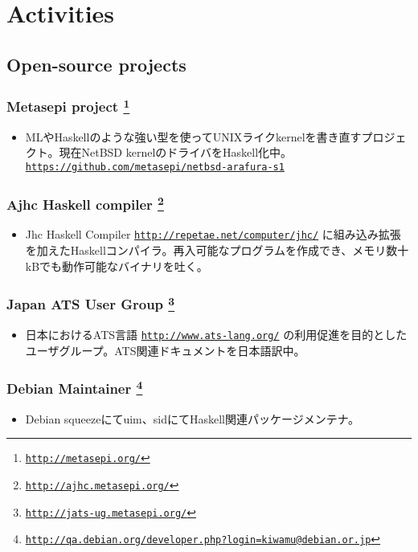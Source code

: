 \documentclass[letterpaper]{article}
\begin{document}
\section*{Activities}

\subsection*{Open-source projects}

\subsubsection*{Metasepi project \footnote{\href{http://metasepi.org/}{\tt http://metasepi.org/}}}
\begin{itemize}
\item MLやHaskellのような強い型を使ってUNIXライクkernelを書き直すプロジェクト。現在NetBSD kernelのドライバをHaskell化中。 \href{https://github.com/metasepi/netbsd-arafura-s1}{\tt https://github.com/metasepi/netbsd-arafura-s1}
\end{itemize}

\subsubsection*{Ajhc Haskell compiler \footnote{\href{http://ajhc.metasepi.org/}{\tt http://ajhc.metasepi.org/}}}
\begin{itemize}
\item Jhc Haskell Compiler \href{http://repetae.net/computer/jhc/}{\tt http://repetae.net/computer/jhc/} に組み込み拡張を加えたHaskellコンパイラ。再入可能なプログラムを作成でき、メモリ数十kBでも動作可能なバイナリを吐く。
\end{itemize}

\subsubsection*{Japan ATS User Group \footnote{\href{http://jats-ug.metasepi.org/}{\tt http://jats-ug.metasepi.org/}}}
\begin{itemize}
\item 日本におけるATS言語 \href{http://www.ats-lang.org/}{\tt http://www.ats-lang.org/} の利用促進を目的としたユーザグループ。ATS関連ドキュメントを日本語訳中。
\end{itemize}

\subsubsection*{Debian Maintainer \footnote{\href{http://qa.debian.org/developer.php?login=kiwamu@debian.or.jp}{\tt http://qa.debian.org/developer.php?login=kiwamu@debian.or.jp}}}
\begin{itemize}
\item Debian squeezeにてuim、sidにてHaskell関連パッケージメンテナ。
\end{itemize}
\end{document}
